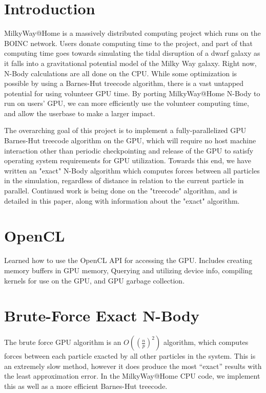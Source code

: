 \documentclass[fleqn,10pt]{SelfArx} %
\begin{document}
\section*{Introduction} %
MilkyWay@Home is a massively distributed computing project which runs on the BOINC network. Users donate computing time to the project, and part of that computing time goes towards simulating the tidal disruption of a dwarf galaxy as it falls into a gravitational potential model of the Milky Way galaxy. Right now, N-Body calculations are all done on the CPU. While some optimization is possible by using a Barnes-Hut treecode algorithm, there is a vast untapped potential for using volunteer GPU time. By porting MilkyWay@Home N-Body to run on users' GPU, we can more efficiently use the volunteer computing time, and allow the userbase to make a larger impact.

The overarching goal of this project is to implement a fully-parallelized GPU Barnes-Hut treecode algorithm on the GPU, which will require no host machine interaction other than periodic checkpointing and release of the GPU to satisfy operating system requirements for GPU utilization. Towards this end, we have written an "exact" N-Body algorithm which computes forces between all particles in the simulation, regardless of distance in relation to the current particle in parallel. Continued work is being done on the "treecode" algorithm, and is detailed in this paper, along with information about the "exact" algorithm.

\section{OpenCL}
Learned how to use the OpenCL API for accessing the GPU. Includes creating memory buffers in GPU memory, Querying and utilizing device info, compiling kernels for use on the GPU, and GPU garbage collection.


\section{Brute-Force Exact N-Body}
The brute force GPU algorithm is an $O\left(\left(\frac{n}{p}\right)^2\right)$ algorithm, which computes forces between each particle exacted by all other particles in the system. This is an extremely slow method, however it does produce the most “exact” results with the least approximation error. In the MilkyWay@Home CPU code, we implement this as well as a more efficient Barnes-Hut treecode.
\end{document}
